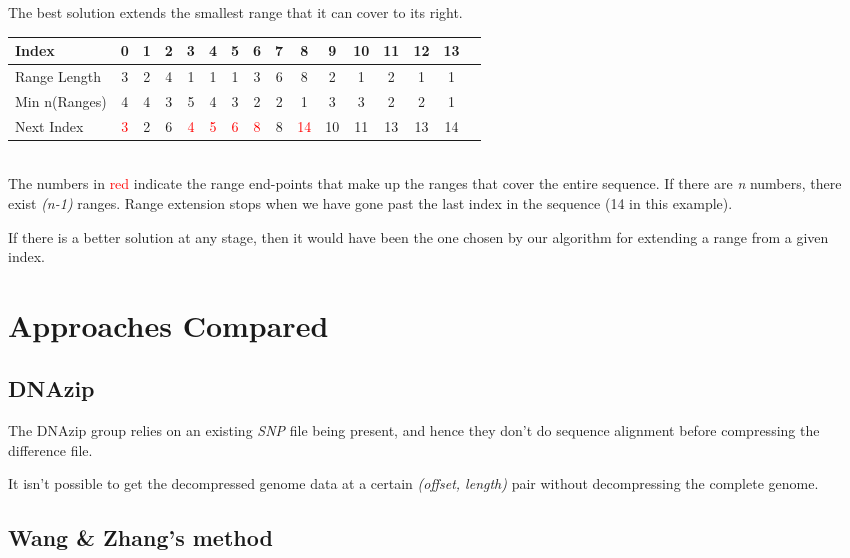\documentclass[11pt]{article}
\begin{document}
The best solution extends the smallest range that it can cover to its
right.

\begin{center}
  \begin{tabular}{|l|c|c|c|c|c|c|c|c|c|c|c|c|c|c|c|}
    \hline
    Index         & 0 & 1 & 2 & 3 & 4 & 5 & 6 & 7 & 8 & 9 &10 &11 &12 &13\\
    \hline
    Range Length  & 3 & 2 & 4 & 1 & 1 & 1 & 3 & 6 & 8 & 2 & 1 & 2 & 1 & 1\\
    \hline
    Min n(Ranges) & 4 & 4 & 3 & 5 & 4 & 3 & 2 & 2 & 1 & 3 & 3 & 2 & 2 & 1\\
    \hline
    Next Index    & \textcolor{red}{3} & 2 & 6 & \textcolor{red}{4} & \textcolor{red}{5} & \textcolor{red}{6} & \textcolor{red}{8} & 8 & \textcolor{red}{14} &10 &11 &13 &13 &14\\
    \hline
  \end{tabular}\\
  \vspace{0.3cm}
  The numbers in \textcolor{red}{red} indicate the range end-points
  that make up the ranges that cover the entire sequence. If there are
  \textit{n} numbers, there exist \textit{(n-1)} ranges. Range
  extension stops when we have gone past the last index in the
  sequence (14 in this example).
\end{center}

If there is a better solution at any stage, then it would have been
the one chosen by our algorithm for extending a range from a given
index.


\section{Approaches Compared}

\subsection{DNAzip}

The DNAzip group relies on an existing \textit{SNP} file being
present, and hence they don't do sequence alignment before compressing
the difference file.

It isn't possible to get the decompressed genome data at a certain
\textit{(offset, length)} pair without decompressing the complete
genome.

\subsection{Wang \& Zhang's method}
\end{document}

